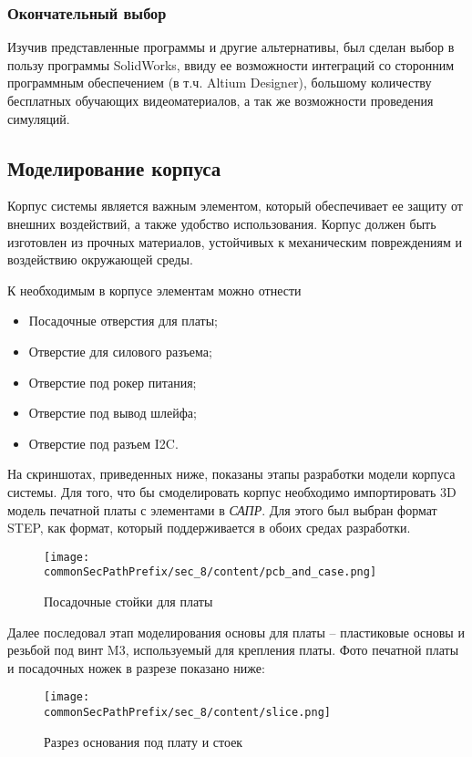 \subsubsection{Окончательный выбор}
Изучив представленные программы и другие альтернативы, был сделан выбор в пользу программы SolidWorks, ввиду ее возможности интеграций со сторонним программным обеспечением (в т.ч. Altium Designer), большому количеству бесплатных обучающих видеоматериалов\cite{sw_docs}, а так же возможности проведения симуляций.

\subsection{Моделирование корпуса}
Корпус системы является важным элементом, который обеспечивает ее защиту от внешних воздействий, а также удобство использования. Корпус должен быть изготовлен из прочных материалов, устойчивых к механическим повреждениям и воздействию окружающей среды.

К необходимым в корпусе элементам можно отнести
\begin{itemize}
    \item Посадочные отверстия для платы;
    \item Отверстие для силового разъема;
    \item Отверстие под рокер питания;
    \item Отверстие под вывод шлейфа;
    \item Отверстие под разъем I2C.
\end{itemize}

На скриншотах, приведенных ниже, показаны этапы разработки модели корпуса системы. Для того, что бы смоделировать корпус необходимо импортировать 3D модель печатной платы с элементами в \textit{САПР}. Для этого был выбран формат STEP, как формат, который поддерживается в обоих средах разработки. 

\begin{figure}[ht]
    \centering
    \texttt{[image: \\commonSecPathPrefix/sec\_8/content/pcb\_and\_case.png]}
    \caption{Посадочные стойки для платы}
\end{figure}

Далее последовал этап моделирования основы для платы -- пластиковые основы и резьбой под винт M3, используемый для крепления платы.
Фото печатной платы и посадочных ножек в разрезе показано ниже:
\begin{figure}[ht]
    \centering
    \texttt{[image: \\commonSecPathPrefix/sec\_8/content/slice.png]}
    \caption{Разрез основания под плату и стоек}
\end{figure}

